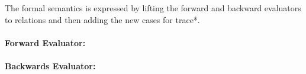 \documentclass{llncs}
\begin{document}
\begin{definition}
The formal semantics is expressed by lifting the forward and backward
evaluators to relations and then adding the new cases for {{trace*}}. 

\paragraph*{Forward Evaluator:}


\paragraph*{Backwards Evaluator:}


\end{definition}
\end{document}
